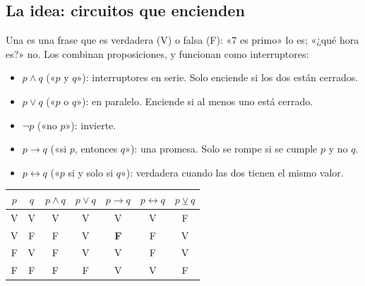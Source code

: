 

\subsection{La idea: circuitos que encienden}
Una  es una frase que es verdadera (V) o falsa (F): «7 es primo» lo es; «¿qué hora es?» no. Los
 combinan proposiciones, y funcionan como interruptores:

\begin{itemize}
  \item $p \wedge q$ («$p$ y $q$»): interruptores en serie. Solo enciende si los dos están cerrados.
  \item $p \vee q$ («$p$ o $q$»): en paralelo. Enciende si al menos uno está cerrado.
  \item $\neg p$ («no $p$»): invierte.
  \item $p \to q$ («si $p$, entonces $q$»): una promesa. Solo se rompe si se cumple $p$ y no $q$.
  \item $p \leftrightarrow q$ («$p$ si y solo si $q$»): verdadera cuando las dos tienen el mismo valor.
\end{itemize}

\begin{center}\small
\begin{tabular}{cc|ccccc}
$p$ & $q$ & $p \wedge q$ & $p \vee q$ & $p \to q$ & $p \leftrightarrow q$ & $p \veebar q$\\\hline
V & V & V & V & V & V & F\\
V & F & F & V & \textbf{F} & F & V\\
F & V & F & V & V & F & V\\
F & F & F & F & V & V & F\\
\end{tabular}
\end{center}

